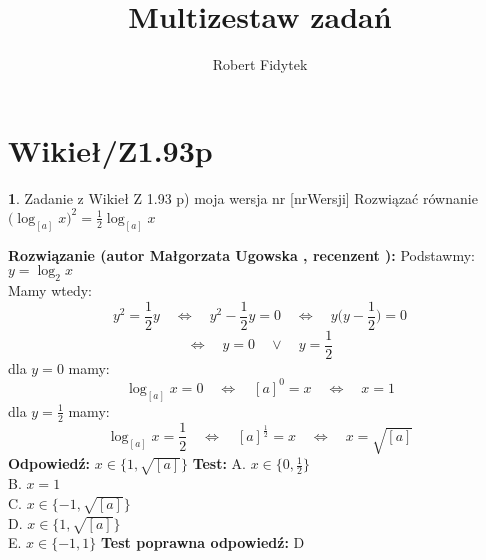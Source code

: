 \documentclass[12pt, a4paper]{article}
\title{Multizestaw zadań}
\author{Robert Fidytek}
\date{}
\theoremstyle{definition} %
\newtheorem{zad}{}
\newcommand{\kategoria}[1]{\section{#1}} %
\newcommand{\zadStart}[1]{\begin{zad}#1\newline} %
\newcommand{\zadStop}{\end{zad}}   %
\newcommand{\rozwStart}[2]{\noindent \textbf{Rozwiązanie (autor #1 , recenzent #2): }\newline} %
\newcommand{\rozwStop}{\newline}                                            %
\newcommand{\odpStart}{\noindent \textbf{Odpowiedź:}\newline}    %
\newcommand{\odpStop}{\newline}                                             %
\newcommand{\testStart}{\noindent \textbf{Test:}\newline} %
\newcommand{\testStop}{\newline} %
\newcommand{\kluczStart}{\noindent \textbf{Test poprawna odpowiedź:}\newline} %
\newcommand{\kluczStop}{\newline} %
\begin{document}
\maketitle


\kategoria{Wikieł/Z1.93p}
\zadStart{Zadanie z Wikieł Z 1.93 p) moja wersja nr [nrWersji]}
Rozwiązać równanie $\big(\log_{[a]}{x}\big)^2=\frac{1}{2}\log_{[a]}{x}$
\zadStop
\rozwStart{Małgorzata Ugowska}{}
Podstawmy: $y=\log_{2}{x}$\\
Mamy wtedy:
$$y^2=\frac{1}{2} y \quad \Longleftrightarrow \quad y^2-\frac{1}{2}y=0 \quad \Longleftrightarrow \quad y \Big(y-\frac{1}{2}\Big)=0$$
$$\Longleftrightarrow \quad y=0 \quad \vee \quad y=\frac{1}{2}$$
dla $y=0$ mamy:
$$\log_{[a]}{x} = 0 \quad \Longleftrightarrow \quad [a]^0=x \quad \Longleftrightarrow \quad x=1$$
dla $y=\frac{1}{2}$ mamy:
$$\log_{[a]}{x} = \frac{1}{2} \quad \Longleftrightarrow \quad [a]^{\frac{1}{2}}=x \quad \Longleftrightarrow \quad x=\sqrt{[a]}$$
\rozwStop
\odpStart
$x \in \{1, \sqrt{[a]}\}$
\odpStop
\testStart
A. $x \in \{0, \frac{1}{2}\}$\\
B. $x=1$\\
C. $x \in \{-1, \sqrt{[a]}\}$\\
D. $x \in \{1, \sqrt{[a]}\}$\\
E. $x \in \{-1, 1\}$
\testStop
\kluczStart
D
\kluczStop
\end{document}
